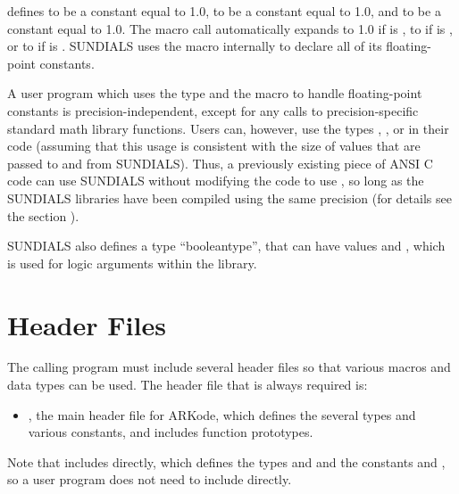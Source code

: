 \documentclass[letterpaper,10pt,english]{sphinxmanual}
\begin{document}
defines  to be a  constant equal to 1.0,  to be a
 constant equal to 1.0, and  to be a  constant
equal to 1.0.  The macro call  automatically expands to
1.0 if  is , to  if  is , or
to  if  is . SUNDIALS uses the 
macro internally to declare all of its floating-point constants.

A user program which uses the type  and the  macro
to handle floating-point constants is precision-independent, except for
any calls to precision-specific standard math library functions.
Users can, however, use the types , , or  in their code (assuming that this usage is consistent with
the size of  values that are passed to and from SUNDIALS).
Thus, a previously existing piece of ANSI C code can use SUNDIALS
without modifying the code to use , so long as the
SUNDIALS libraries have been compiled using the same precision (for
details see the section {\hyperref[Install:installation]{\emph{}}}).

SUNDIALS also defines a type ``booleantype'', that can have
values  and , which is used for logic arguments
within the library.


\section{Header Files}
\label{c_interface/General:header-files}
The calling program must include several header files so that various
macros and data types can be used. The header file that is always
required is:
\begin{itemize}
\item {} 
, the main header file for ARKode, which defines the
several types and various constants, and includes function
prototypes.

\end{itemize}

Note that  includes  directly, which
defines the types  and  and the
constants  and , so a user program does not need to
include  directly.
\end{document}
